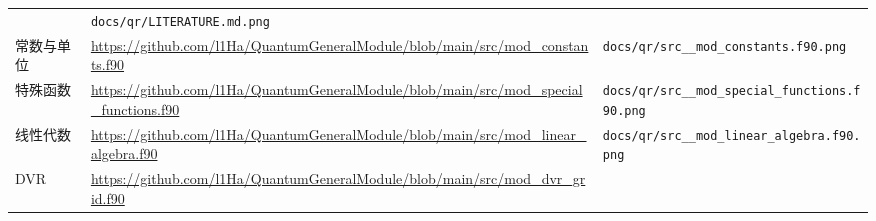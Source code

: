 \documentclass[
  a4paper,
]{ctexbook}
\begin{document}
\begin{longtable}[]{@{}lll@{}}
\begin{minipage}[t]{0.30\columnwidth}
\end{minipage} & \begin{minipage}[t]{0.30\columnwidth}\raggedright
\texttt{docs/qr/LITERATURE.md.png}\strut
\end{minipage}\tabularnewline
\begin{minipage}[t]{0.30\columnwidth}\raggedright
常数与单位\strut
\end{minipage} & \begin{minipage}[t]{0.30\columnwidth}\raggedright
\url{https://github.com/l1Ha/QuantumGeneralModule/blob/main/src/mod_constants.f90}\strut
\end{minipage} & \begin{minipage}[t]{0.30\columnwidth}\raggedright
\texttt{docs/qr/src\_\_mod\_constants.f90.png}\strut
\end{minipage}\tabularnewline
\begin{minipage}[t]{0.30\columnwidth}\raggedright
特殊函数\strut
\end{minipage} & \begin{minipage}[t]{0.30\columnwidth}\raggedright
\url{https://github.com/l1Ha/QuantumGeneralModule/blob/main/src/mod_special_functions.f90}\strut
\end{minipage} & \begin{minipage}[t]{0.30\columnwidth}\raggedright
\texttt{docs/qr/src\_\_mod\_special\_functions.f90.png}\strut
\end{minipage}\tabularnewline
\begin{minipage}[t]{0.30\columnwidth}\raggedright
线性代数\strut
\end{minipage} & \begin{minipage}[t]{0.30\columnwidth}\raggedright
\url{https://github.com/l1Ha/QuantumGeneralModule/blob/main/src/mod_linear_algebra.f90}\strut
\end{minipage} & \begin{minipage}[t]{0.30\columnwidth}\raggedright
\texttt{docs/qr/src\_\_mod\_linear\_algebra.f90.png}\strut
\end{minipage}\tabularnewline
\begin{minipage}[t]{0.30\columnwidth}\raggedright
DVR\strut
\end{minipage} & \begin{minipage}[t]{0.30\columnwidth}\raggedright
\url{https://github.com/l1Ha/QuantumGeneralModule/blob/main/src/mod_dvr_grid.f90}\strut
\end{minipage} & \begin{minipage}[t]{0.30\columnwidth}\raggedright

\end{minipage}
\end{longtable}
\end{document}
